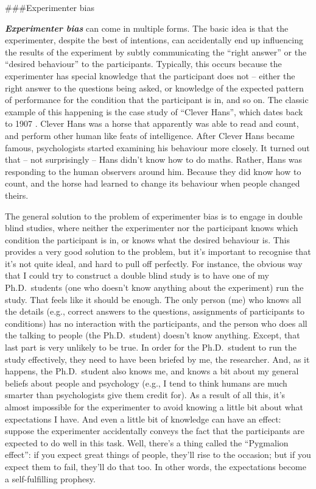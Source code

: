 \documentclass[]{book}
\begin{document}
\#\#\#Experimenter bias

\textbf{\emph{Experimenter bias}} can come in multiple forms. The basic idea is that the experimenter, despite the best of intentions, can accidentally end up influencing the results of the experiment by subtly communicating the ``right answer'' or the ``desired behaviour'' to the participants. Typically, this occurs because the experimenter has special knowledge that the participant does not -- either the right answer to the questions being asked, or knowledge of the expected pattern of performance for the condition that the participant is in, and so on. The classic example of this happening is the case study of ``Clever Hans'', which dates back to 1907 \citep{Pfungst1911, Hothersall2004}. Clever Hans was a horse that apparently was able to read and count, and perform other human like feats of intelligence. After Clever Hans became famous, psychologists started examining his behaviour more closely. It turned out that -- not surprisingly -- Hans didn't know how to do maths. Rather, Hans was responding to the human observers around him. Because they did know how to count, and the horse had learned to change its behaviour when people changed theirs.

The general solution to the problem of experimenter bias is to engage in double blind studies, where neither the experimenter nor the participant knows which condition the participant is in, or knows what the desired behaviour is. This provides a very good solution to the problem, but it's important to recognise that it's not quite ideal, and hard to pull off perfectly. For instance, the obvious way that I could try to construct a double blind study is to have one of my Ph.D.~students (one who doesn't know anything about the experiment) run the study. That feels like it should be enough. The only person (me) who knows all the details (e.g., correct answers to the questions, assignments of participants to conditions) has no interaction with the participants, and the person who does all the talking to people (the Ph.D.~student) doesn't know anything. Except, that last part is very unlikely to be true. In order for the Ph.D.~student to run the study effectively, they need to have been briefed by me, the researcher. And, as it happens, the Ph.D.~student also knows me, and knows a bit about my general beliefs about people and psychology (e.g., I tend to think humans are much smarter than psychologists give them credit for). As a result of all this, it's almost impossible for the experimenter to avoid knowing a little bit about what expectations I have. And even a little bit of knowledge can have an effect: suppose the experimenter accidentally conveys the fact that the participants are expected to do well in this task. Well, there's a thing called the ``Pygmalion effect'': if you expect great things of people, they'll rise to the occasion; but if you expect them to fail, they'll do that too. In other words, the expectations become a self-fulfilling prophesy.
\end{document}
